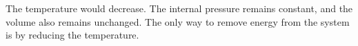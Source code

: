 The temperature would decrease. The internal pressure remains constant, and the volume also remains unchanged. The only way to remove energy from the system is by reducing the temperature.